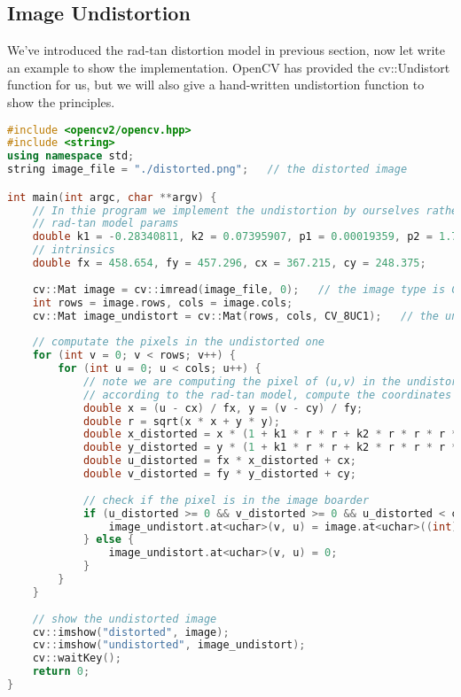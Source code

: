 \subsection{Image Undistortion}
We've introduced the rad-tan distortion model in previous section, now let write an example to show the implementation. OpenCV has provided the cv::Undistort function for us, but we will also give a hand-written undistortion function to show the principles.

\begin{lstlisting}[language=C++,caption=slambook/ch5/imageBasics/undistortImage.cpp]
#include <opencv2/opencv.hpp>
#include <string>
using namespace std;
string image_file = "./distorted.png";   // the distorted image 

int main(int argc, char **argv) {
    // In thie program we implement the undistortion by ourselves rather than using opencv
    // rad-tan model params
    double k1 = -0.28340811, k2 = 0.07395907, p1 = 0.00019359, p2 = 1.76187114e-05;
    // intrinsics
    double fx = 458.654, fy = 457.296, cx = 367.215, cy = 248.375;
    
    cv::Mat image = cv::imread(image_file, 0);   // the image type is CV_8UC1
    int rows = image.rows, cols = image.cols;
    cv::Mat image_undistort = cv::Mat(rows, cols, CV_8UC1);   // the undistorted image
    
    // computate the pixels in the undistorted one
    for (int v = 0; v < rows; v++) {
        for (int u = 0; u < cols; u++) {
            // note we are computing the pixel of (u,v) in the undistorted image
            // according to the rad-tan model, compute the coordinates in the distorted image
            double x = (u - cx) / fx, y = (v - cy) / fy;
            double r = sqrt(x * x + y * y);
            double x_distorted = x * (1 + k1 * r * r + k2 * r * r * r * r) + 2 * p1 * x * y + p2 * (r * r + 2 * x * x);
            double y_distorted = y * (1 + k1 * r * r + k2 * r * r * r * r) + p1 * (r * r + 2 * y * y) + 2 * p2 * x * y;
            double u_distorted = fx * x_distorted + cx;
            double v_distorted = fy * y_distorted + cy;
            
            // check if the pixel is in the image boarder
            if (u_distorted >= 0 && v_distorted >= 0 && u_distorted < cols && v_distorted < rows) {
                image_undistort.at<uchar>(v, u) = image.at<uchar>((int) v_distorted, (int) u_distorted);
            } else {
                image_undistort.at<uchar>(v, u) = 0;
            }
        }
    }
    
    // show the undistorted image
    cv::imshow("distorted", image);
    cv::imshow("undistorted", image_undistort);
    cv::waitKey();
    return 0;
}
\end{lstlisting}

